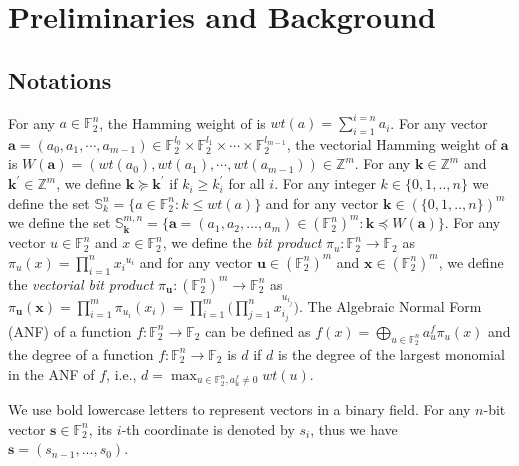 
\section{Preliminaries and Background}	\label{sec:prelim_and_backgrnd}

\subsection{Notations}	\label{subsec:notation}
For any $a \in \mathbb{F}_2^n$, the Hamming weight of is $wt(a) = \sum\limits_{i=1}^{i=n}a_i$. For any vector $\boldsymbol{a} = (a_0,a_1,\cdots,a_{m-1}) \in  \mathbb{F}_2^{l_0} \times \mathbb{F}_2^{l_1} \times \cdots \times \mathbb{F}_2^{l_{m-1}}$, the vectorial Hamming weight of $\textbf{a}$ is $W(\boldsymbol{a}) = (wt(a_0),wt(a_1),\cdots,wt(a_{m-1})) \in \mathbb{Z}^m$. For any $\boldsymbol{k} \in \mathbb{Z}^m$ and $ \boldsymbol{k^{\prime}} \in \mathbb{Z}^m$, we define $\boldsymbol{k} \succeq \boldsymbol{k^{\prime}}$ if $k_i \geq k_i^{\prime}$ for all $i$. For any integer $k \in  \{0,1,..,n \}$ we define the set $\mathbb{S}_k^n = \{a\in \mathbb{F}_2^n:k \leq wt(a) \}$ and for any vector $\boldsymbol{k} \in  (\{0,1,..,n \})^m$ we define the set
$\mathbb{S}_{\boldsymbol{k}}^{m,n} = \{\boldsymbol{a} = (a_1,a_2,...,a_m)\in (\mathbb{F}_2^n)^m:\boldsymbol{k} \preceq W({\boldsymbol{a}})\}.$ For any vector $u \in  \mathbb{F}_2^n$ and $x \in  \mathbb{F}_2^n$, we define the \textit{bit product} $\pi_u:\mathbb{F}_2^n \to \mathbb{F}_2$ as
$\pi_u(x) = \prod_{i=1}^{n}{x_i}^{u_i}$ and for any vector $\boldsymbol{u} \in  (\mathbb{F}_2^n)^m$ and $\boldsymbol{x} \in  (\mathbb{F}_2^n)^m$, we define the \textit{vectorial bit product} $\pi_{\boldsymbol{u}}:(\mathbb{F}_2^n)^m \to \mathbb{F}_2^n$ as
$\pi_{\boldsymbol{u}}(\boldsymbol{x}) = \prod_{i=1}^{m}\pi_{u_i}(x_i)=\prod_{i=1}^{m}\Big(\prod_{j=1}^{n}x_{i_j}^{u_{i_j}}\Big).$
The Algebraic Normal Form (ANF) of a function $f:\mathbb{F}_2^n \to \mathbb{F}_2$ can be defined as
$f(x)=\bigoplus_{u\in \mathbb{F}_2^n} a_{u}^f \pi_u(x)$
and the degree of a function $f:\mathbb{F}_2^n \to \mathbb{F}_2$ is $d$ if $d$ is the degree of the largest monomial in the ANF of $f$, i.e.,
$ d = \max_{u \in \mathbb{F}_2^n, a_{u}^f \neq 0} wt(u).$

We use bold lowercase letters to represent vectors in a binary field. For any $n$-bit
vector $\mathbf{s} \in \mathbb{F}_2^n$, its $i$-th coordinate is denoted by $s_i$,
thus we have $\mathbf{s} = (s_{n-1},...,s_0)$.



